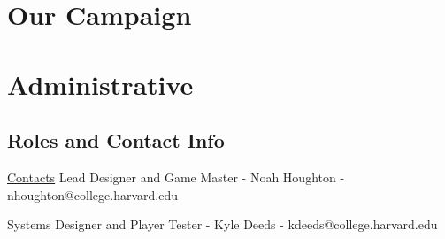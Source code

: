 \documentclass[letterpaper,10pt,twoside,twocolumn,openany]{dndbook}
\begin{document}
\part{Our Campaign}


\part{Administrative}
\chapter{Roles and Contact Info} \label{contact}
\hyperlink{contact}{Contacts}
Lead Designer and Game Master - Noah Houghton - nhoughton@college.harvard.edu

Systems Designer and Player Tester - Kyle Deeds - kdeeds@college.harvard.edu
\end{document}
